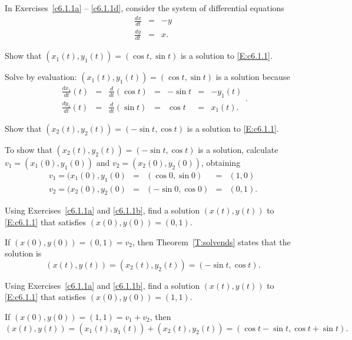 \documentclass{ximera}
\begin{document}
\noindent In Exercises~\ref{c6.1.1a} -- \ref{c6.1.1d}, consider the system of
differential equations
\begin{equation} \label{E:c6.1.1}
\begin{array}{rcr}
\frac{dx}{dt}  & = & -y \\
\frac{dy}{dt}  & = &  x.
\end{array}
\end{equation}
\begin{exercise} \label{c6.1.1a}
Show that $(x_1(t),y_1(t)) = (\cos t,\sin t)$ is a solution to \eqref{E:c6.1.1}.

\begin{solution}

Solve by evaluation:
$(x_1(t),y_1(t)) = (\cos t, \sin t)$
is a solution because
\[ \begin{array}{ccccccc}
\frac{dx_1}{dt}(t) & = & \frac{d}{dt}(\cos t) & = & -\sin t & = & -y_1(t)
\\ \frac{dy_1}{dt}(t) & = & \frac{d}{dt}(\sin t) & = & \cos t & = & x_1(t).
\end{array}. \]

\end{solution}
\end{exercise}
\begin{exercise} \label{c6.1.1b}
Show that $(x_2(t),y_2(t)) = (-\sin t,\cos t)$ is a solution to \eqref{E:c6.1.1}.

\begin{solution}
To show that $(x_2(t),y_2(t)) = (-\sin t, \cos t)$
is a solution, calculate $v_1 = (x_1(0),y_1(0))$ and
$v_2 = (x_2(0),y_2(0))$, obtaining
\[
\begin{array}{ccccl}
v_1 = (x_1(0),y_1(0) & = & (\cos 0,\sin 0) & = & (1,0) \\
v_2 = (x_2(0),y_2(0) & = & (-\sin 0,\cos 0) & = & (0,1).
\end{array}
\]

\end{solution}
\end{exercise}
\begin{exercise} \label{c6.1.1c}
Using Exercises~\ref{c6.1.1a} and \ref{c6.1.1b}, find a solution $(x(t),y(t))$
to \eqref{E:c6.1.1} that satisfies $(x(0),y(0)) = (0,1)$.

\begin{solution}

If $(x(0),y(0)) = (0,1) = v_2$, then Theorem~\ref{T:solvends} states
that the solution is
\[
(x(t),y(t)) = (x_2(t),y_2(t)) = (-\sin t,\cos t).
\]

\end{solution}
\end{exercise}
\begin{exercise} \label{c6.1.1d}
Using Exercises~\ref{c6.1.1a} and \ref{c6.1.1b}, find a solution $(x(t),y(t))$
to \eqref{E:c6.1.1} that satisfies $(x(0),y(0)) = (1,1)$.

\begin{solution}

If $(x(0),y(0)) = (1,1) = v_1 + v_2$, then
\[
(x(t),y(t)) = (x_1(t),y_1(t)) + (x_2(t),y_2(t)) =
(\cos t - \sin t, \cos t + \sin t).
\]

\end{solution}
\end{exercise}
\end{document}

